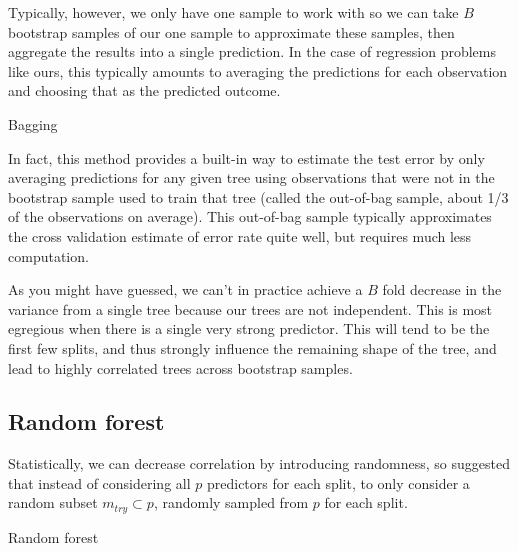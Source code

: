 \documentclass[12pt]{article}
\begin{document}
Typically, however, we only have one sample to work with so we can take $B$ bootstrap samples of our one sample to approximate these samples, then aggregate the results into a single prediction. In the case of regression problems like ours, this typically amounts to averaging the predictions for each observation and choosing that as the predicted outcome. 

\begin{algorithm}[H]
 \caption{Bagging}
\end{algorithm}

In fact, this method provides a built-in way to estimate the test error by only averaging predictions for any given tree using observations that were not in the bootstrap sample used to train that tree (called the out-of-bag sample, about 1/3 of the observations on average). This out-of-bag sample typically approximates the cross validation estimate of error rate quite well, but requires much less computation.

As you might have guessed, we can't in practice achieve a $B$ fold decrease in the variance from a single tree because our trees are not independent. This is most egregious when there is a single very strong predictor. This will tend to be the first few splits, and thus strongly influence the remaining shape of the tree, and lead to highly correlated trees across bootstrap samples. 


\subsection{Random forest} %
\label{sub:random_forest}

Statistically, we can decrease correlation by introducing randomness, so \textcite{rf} suggested that instead of considering all $p$ predictors for each split, to only consider a random subset $m_{try} \subset p$, randomly sampled from $p$ for each split. 

\begin{algorithm}[H]
 \caption{Random forest}
\end{algorithm}
\end{document}
